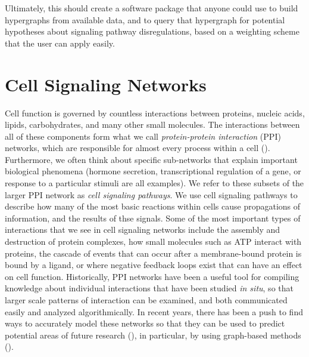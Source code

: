 \documentclass[12pt,twoside]{reedthesis}
\theoremstyle{definition}
\begin{document}
 Ultimately, this should create a software package that anyone could use to build hypergraphs from available data, and to query that hypergraph for potential hypotheses about signaling pathway disregulations, based on a weighting scheme that the user can apply easily.\par

\chapter{Cell Signaling Networks}

Cell function is governed by countless interactions between proteins, nucleic acids, lipids, carbohydrates, and many other small molecules.  The interactions between all of these components form what we call \textit{protein-protein interaction} (PPI) networks, which are responsible for almost every process within a cell (\cite{Taylor2009}). Furthermore, we often think about specific sub-networks that explain important biological phenomena (hormone secretion, transcriptional regulation of a gene, or response to a particular stimuli are all examples). We refer to these subsets of the larger PPI network as \textit{cell signaling pathways}. We use cell signaling pathways to describe how many of the most basic reactions within cells cause propagations of information, and the results of thse signals.  Some of the most important types of interactions that we see in cell signaling networks include the assembly and destruction of protein complexes, how small molecules such as ATP interact with proteins, the cascade of events that can occur after a membrane-bound protein is bound by a ligand, or where negative feedback loops exist that can have an effect on cell function.  Historically, PPI networks have been a useful tool for compiling knowledge about individual interactions that have been studied \textit{in situ}, so that larger scale patterns of interaction can be examined, and both communicated easily and analyzed algorithmically. In recent years, there has been a push to find ways to accurately model these networks so that they can be used to predict potential areas of future research (\cite{Haverty2004}), in particular, by using graph-based methods (\cite{Aittokallio2006}).\par
\end{document}
